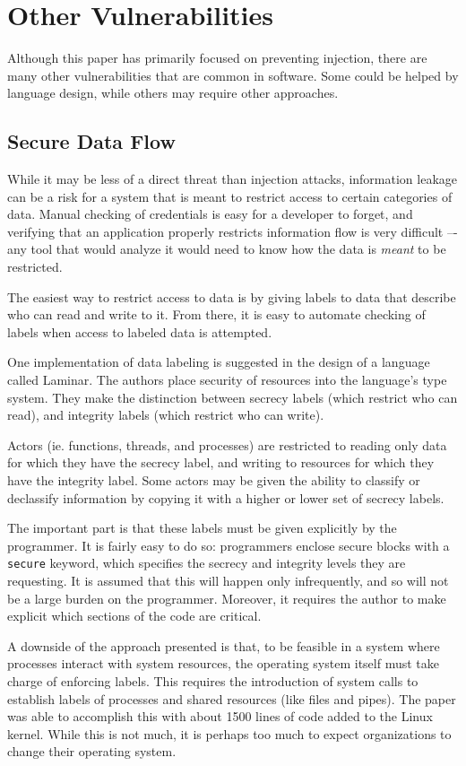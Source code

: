 \documentclass[twocolumn]{article}
\begin{document}
\section{Other Vulnerabilities}
Although this paper has primarily focused on preventing injection, there are many other vulnerabilities that are common in software.  Some could be helped by language design, while others may require other approaches.

\subsection{Secure Data Flow}
While it may be less of a direct threat than injection attacks, information leakage can be a risk for a system that is meant to restrict access to certain categories of data.  Manual checking of credentials is easy for a developer to forget, and verifying that an application properly restricts information flow is very difficult –- any tool that would analyze it would need to know how the data is \textit{meant} to be restricted.

The easiest way to restrict access to data is by giving labels to data that describe who can read and write to it.  From there, it is easy to automate checking of labels when access to labeled data is attempted.

One implementation of data labeling is suggested in the design of a language called Laminar.  The authors place security of resources into the language's type system.  They make the distinction between secrecy labels (which restrict who can read), and integrity labels (which restrict who can write).\cite{roy2009}

Actors (ie. functions, threads, and processes) are restricted to reading only data for which they have the secrecy label, and writing to resources for which they have the integrity label.  Some actors may be given the ability to classify or declassify information by copying it with a higher or lower set of secrecy labels.

The important part is that these labels must be given explicitly by the programmer.  It is fairly easy to do so: programmers enclose secure blocks with a \verb;secure; keyword, which specifies the secrecy and integrity levels they are requesting.  It is assumed that this will happen only infrequently, and so will not be a large burden on the programmer.  Moreover, it requires the author to make explicit which sections of the code are critical.\cite{roy2009}

A downside of the approach presented is that, to be feasible in a system where processes interact with system resources, the operating system itself must take charge of enforcing labels.   This requires the introduction of system calls to establish labels of processes and shared resources (like files and pipes).  The paper was able to accomplish this with about 1500 lines of code added to the Linux kernel.\cite{roy2009}  While this is not much, it is perhaps too much to expect organizations to change their operating system.
\end{document}
